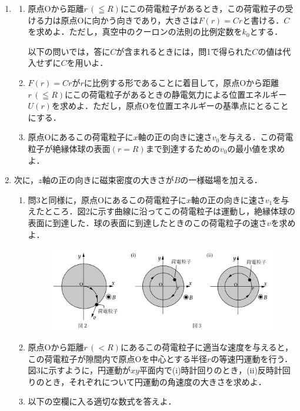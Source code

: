\begin{enumerate}[label = {〔 \Roman* 〕}]
  \item 
    \begin{enumerate}[label={問\arabic*}]
      \setlength{\itemindent}{1\zw}
      \setlength{\labelsep}{1\zw}
      \setlength{\parindent}{1\zw}
      \item 原点Oから距離$r \, ( \leqq R)$にこの荷電粒子があるとき，この荷電粒子の受ける力は原点Oに向かう向きであり，大きさは$F(r) = Cr$と書ける．$C$を求めよ．ただし，真空中のクーロンの法則の比例定数を$k_0$とする．

        以下の問いでは，答に$C$が含まれるときには，問1で得られた$C$の値は代入せずに$C$を用いよ．
      \item $F(r) = Cr$が$r$に比例する形であることに着目して，原点Oから距離$r\, (\leqq R)$にこの荷電粒子があるときの静電気力による位置エネルギー$U(r)$を求めよ．ただし，原点Oを位置エネルギーの基準点にとることにする．
      \item 原点Oにあるこの荷電粒子に$x$軸の正の向きに速さ$v_0$を与える．この荷電粒子が絶縁体球の表面$(r = R)$まで到達するための$v_0$の最小値を求めよ．
    \end{enumerate}
  \item 次に，$z$軸の正の向きに磁束密度の大きさが$B$の一様磁場を加える．
    \begin{enumerate}[label={問\arabic*}, resume]
      \setlength{\itemindent}{1\zw}
      \setlength{\labelsep}{1\zw}
      \setlength{\parindent}{1\zw}

      \item 問3と同様に，原点Oにあるこの荷電粒子に$x$軸の正の向きに速さ$v_1$を与えたところ．図2に示す曲線に沿ってこの荷電粒子は運動し，絶縁体球の表面に到達した．球の表面に到達したときのこの荷電粒子の速さ$v$を求めよ．
      \begin{figure}[H]
        \centering
        \includegraphics[width=11cm]{fig/fig_4_3_2.pdf}
      \end{figure}
      \item 原点Oから距離$r \, (< R)$にあるこの荷電粒子に適当な速度を与えると，この荷電粒子が隙間内で原点Oを中心とする半径$r$の等速円運動を行う．図3に示すように，円運動が$xy$平面内で(i)時計回りのとき，(ii)反時計回りのとき，それぞれについて円運動の角速度の大きさを求めよ．　
      \item  以下の空欄に入る適切な数式を答えよ．


\end{enumerate}
\end{enumerate}
